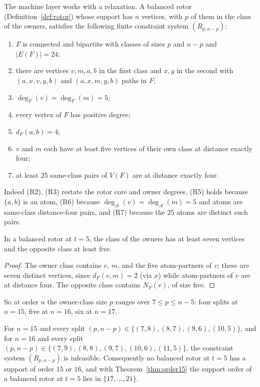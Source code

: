 The machine layer works with a relaxation. A balanced rotor
(Definition~\ref{def:rotor}) whose support has \(n\) vertices, with
\(p\) of them in the class of the owners, satisfies the following
finite constraint system \((R_{p,n-p})\):
\begin{enumerate}[label=\textup{(R\arabic*)}]
\item \(F\) is connected and bipartite with classes of sizes
\(p\) and \(n-p\) and \(|E(F)|=24\);
\item there are vertices \(v,m,a,b\) in the first class and \(x,y\) in
the second with \((a,x,v,y,b)\) and \((a,x,m,y,b)\) paths in \(F\);
\item \(\deg_F(v)=\deg_F(m)=5\);
\item every vertex of \(F\) has positive degree;
\item \(d_F(a,b)=4\);
\item \(v\) and \(m\) each have at least five vertices of their own
class at distance exactly four;
\item at least \(25\) same-class pairs of \(V(F)\) are at distance
exactly four.
\end{enumerate}
Indeed (R2), (R3) restate the rotor core and owner degrees, (R5) holds
because \(\{a,b\}\) is an atom, (R6) because
\(\deg_{\mathcal A}(v)=\deg_{\mathcal A}(m)=5\) and atoms are
same-class distance-four pairs, and (R7) because the \(25\) atoms are
distinct such pairs.

\begin{lemma}\label{lem:shores}
In a balanced rotor at \(t=5\), the class of the owners has at least
seven vertices and the opposite class at least five.
\end{lemma}

\begin{proof}
The owner class contains \(v\), \(m\), and the five atom-partners of
\(v\); these are seven distinct vertices, since \(d_F(v,m)=2\) (via
\(x\)) while atom-partners of \(v\) are at distance four. The opposite
class contains \(N_F(v)\), of size five.
\end{proof}

So at order \(n\) the owner-class size \(p\) ranges over
\(7\le p\le n-5\): four splits at \(n=15\), five at \(n=16\), six at
\(n=17\).

\begin{proposition}\label{prop:orders1516}
For \(n=15\) and every split
\((p,n-p)\in\{(7,8),(8,7),(9,6),(10,5)\}\), and for \(n=16\) and every
split \((p,n-p)\in\{(7,9),(8,8),(9,7),(10,6),(11,5)\}\), the
constraint system \((R_{p,n-p})\) is infeasible. Consequently no
balanced rotor at \(t=5\) has a support of order \(15\) or \(16\), and
with Theorem~\ref{thm:order15} the support order of a balanced rotor
at \(t=5\) lies in \(\{17,\dots,21\}\).
\end{proposition}

